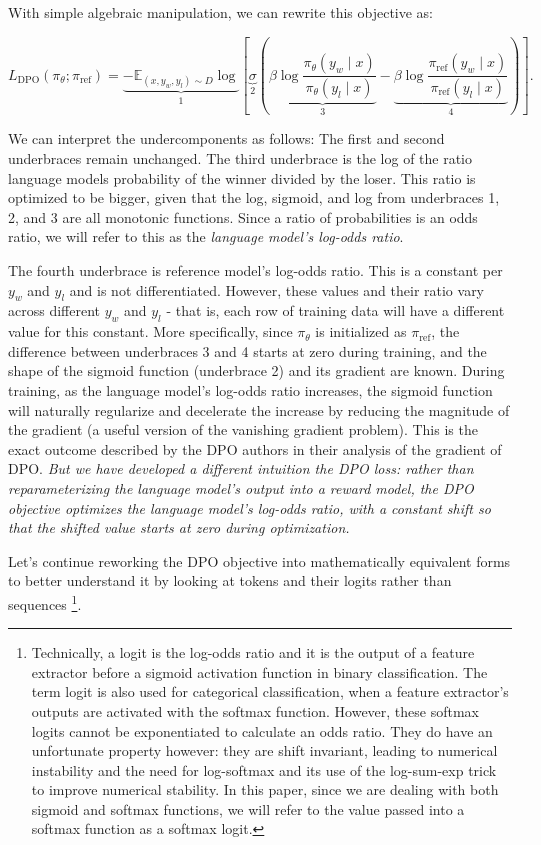 \documentclass[twoside,11pt]{article}
\begin{document}
With simple algebraic manipulation, we can rewrite this objective as:

\[
  \label{eq:reg}
  L_\mathrm{DPO}(\pi_\theta; \pi_\mathrm{ref}) =
  \underbrace{
  -\mathbb{E}_{(x, y_w, y_l) \sim D} 
  \log }_{1} 
  \left[ 
    \underbrace{\sigma }_{2}
    \left(
    \underbrace{\beta \log \frac{\pi_\theta(y_w \mid x)}{\pi_\theta(y_l \mid x)}}_{3}
    - \underbrace{\beta \log \frac{\pi_\mathrm{ref}(y_w \mid x)}{\pi_\mathrm{ref}(y_l \mid x)}}_{4} 
    \right)
  \right].
\]

We can interpret the undercomponents as follows: 
The first and second underbraces remain unchanged. 
The third underbrace is the log of the ratio
language models probability of the winner divided by the loser. This ratio 
is optimized to be bigger, given that the log, sigmoid, and log from underbraces
1, 2, and 3 are all monotonic functions. Since a ratio of probabilities is
an odds ratio, we will refer to this as the 
\emph{language model's log-odds ratio}. 

The fourth underbrace is reference model's log-odds ratio. This
is a constant per $y_w$ and $y_l$ and is not differentiated. However,
these values and their ratio vary across different $y_w$ and $y_l$ - that is,
each row of training data will have a different value for this constant. 
More specifically, since $\pi_\theta$ is initialized as $\pi_\mathrm{ref}$, 
the difference between underbraces 3 and 4 starts at zero during training, 
and the shape of the sigmoid function (underbrace 2) and its gradient are
known. During training, as the language model's log-odds ratio increases,
the sigmoid function will naturally regularize and decelerate
the increase by reducing the magnitude of the gradient (a 
useful version of the vanishing gradient problem). 
This is the exact outcome described by the DPO authors 
in their analysis of the gradient of DPO. \emph{But we have developed a different
intuition the DPO loss: rather than reparameterizing the language model's
output into a reward model, the DPO objective optimizes the 
language model's log-odds ratio, with a constant shift so that the 
shifted value starts at zero during optimization.}

Let's continue reworking the DPO objective into mathematically
equivalent forms to better understand it by looking at tokens and their logits rather
than sequences \footnote{
  Technically, a logit is the log-odds ratio and it is the output of a 
  feature extractor before a sigmoid activation function in binary
  classification. The term logit is also used for categorical classification,
  when a feature extractor's outputs are 
  activated with the softmax function. However,
  these softmax logits cannot be exponentiated to calculate an odds ratio. 
  They do have an unfortunate property
  however: they are shift invariant, leading to numerical instability and
  the need for log-softmax and its use of the log-sum-exp trick to improve
  numerical stability. In this paper, since we are dealing
  with both sigmoid and softmax functions, we will refer to the value
  passed into a softmax function as a softmax logit.
}. 
\end{document}
